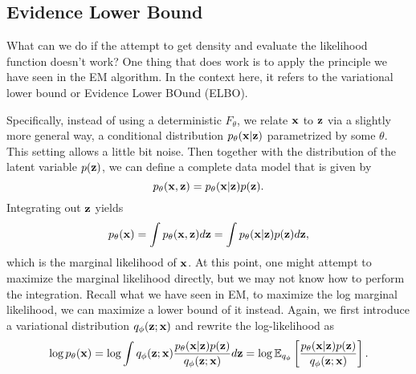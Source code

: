\documentclass[../main.tex]{subfiles}
\begin{document}
\subsection{Evidence Lower Bound}
What can we do if the attempt to get density and evaluate the likelihood function doesn't work? One thing that does work is to apply the principle we have seen in the EM algorithm. In the context here, it refers to the variational lower bound or Evidence Lower BOund (ELBO). 
\par Specifically, instead of using a deterministic $F_{\theta}$, we relate ${\bf x}$ to ${\bf z}$ via a slightly more general way, a conditional distribution $p_{\theta}({\bf x}|{\bf z})$ parametrized by some $\theta$. This setting allows a little bit noise. Then together with the distribution of the latent variable $p({\bf z})$, we can define a complete data model that is given by
\begin{equation*}
p_{\theta}({\bf x},{\bf z})=p_{\theta}({\bf x}|{\bf z})p({\bf z}).
\end{equation*}
Integrating out ${\bf z}$ yields
\begin{equation*}
p_{\theta}({\bf x})=\int p_{\theta}({\bf x},{\bf z})d{\bf z} = \int p_{\theta}({\bf x}|{\bf z})p({\bf z})d{\bf z},
\end{equation*}
which is the marginal likelihood of ${\bf x}$. At this point, one might attempt to maximize the marginal likelihood directly, but we may not know how to perform the integration. Recall what we have seen in EM, to maximize the log marginal likelihood, we can maximize a lower bound of it instead. Again, we first introduce a variational distribution $q_{\phi}({\bf z};{\bf x})$ and rewrite the log-likelihood as
\begin{equation*}
\log p_{\theta}({\bf x})=\log \int q_{\phi}({\bf z};{\bf x}) \frac{p_{\theta}({\bf x}|{\bf z})p({\bf z})}{q_{\phi}({\bf z};{\bf x})}d{\bf z} = \log \mathbb{E}_{q_{\phi}} \left[\frac{p_{\theta}({\bf x}|{\bf z})p({\bf z})}{q_{\phi}({\bf z};{\bf x})}\right].
\end{equation*}
\end{document}

